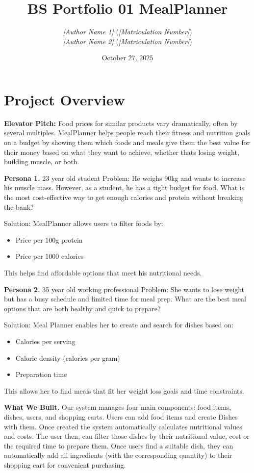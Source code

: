 \documentclass[11pt]{article}
\title{BS Portfolio 01 MealPlanner}
\author{
  \textit{[Author Name 1]} (\textit{[Matriculation Number]})\\
  \textit{[Author Name 2]} (\textit{[Matriculation Number]})
}
\date{October 27, 2025}
\begin{document}
\maketitle

\section{Project Overview}

\textbf{Elevator Pitch:} Food prices for similar products vary dramatically, often by several multiples. 
MealPlanner helps people reach their fitness and nutrition goals on a budget by showing them which foods and meals give them the best value for their money based on what they want to achieve, whether thats losing weight, building muscle, or both.

\textbf{Persona 1.} 23 year old student
Problem: He weighs 90kg and wants to increase his muscle mass. However, as a student, he has a tight budget for food. 
What is the most cost-effective way to get enough calories and protein without breaking the bank?

Solution: MealPlanner allows users to filter foods by:
\begin{itemize}[noitemsep]
  \item Price per 100g protein
  \item Price per 1000 calories
\end{itemize}
This helps find affordable options that meet his nutritional needs.

\textbf{Persona 2.} 35 year old working professional
Problem: She wants to lose weight but has a busy schedule and limited time for meal prep. What are the best meal options that are both healthy and quick to prepare?

Solution: Meal Planner enables her to create and search for dishes based on:
\begin{itemize}[noitemsep]
  \item Calories per serving
  \item Caloric density (calories per gram)
  \item Preparation time
\end{itemize}
This allows her to find meals that fit her weight loss goals and time constraints.


\textbf{What We Built.} Our system manages four main components: food items, dishes, users, and shopping carts. Users can add food items and create Dishes with them. Once created the system automatically calculates nutritional values and costs. The user then, can filter those dishes by their nutritional value, cost or the required time to prepare them. Once users find a suitable dish, they can automatically add all ingredients (with the corresponding quantity) to their shopping cart for convenient purchasing.
\end{document}
